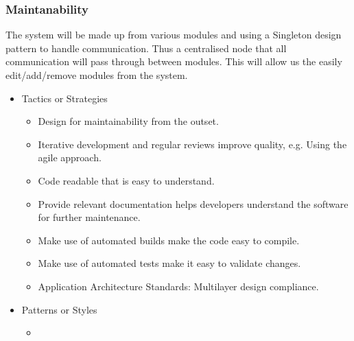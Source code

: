 \subsubsection{Maintanability}
		The system will be made up from various modules and using a Singleton design pattern to handle communication. Thus a centralised node that all communication will pass through between modules. This will allow us the easily edit/add/remove modules from the system.
		\begin{itemize}
	\item{Tactics or Strategies}
		\begin{itemize}
			\item Design for maintainability from the outset.
			\item Iterative development and regular reviews improve quality, e.g. Using the agile approach.
			\item Code readable that is easy to understand.
			\item Provide relevant documentation helps developers understand the software for further maintenance.
			\item Make use of automated builds make the code easy to compile.
			\item Make use of automated tests make it easy to validate changes.
			\item Application Architecture Standards: Multilayer design compliance.
		\end{itemize}
	\item{Patterns or Styles}
		\begin{itemize}
			\item
		\end{itemize}
\end{itemize}
